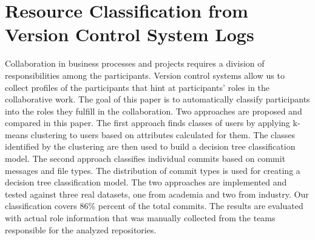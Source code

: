 \chapter{Resource Classification from Version Control System Logs}
\label{chap:resource-classfication}

Collaboration in business processes and projects requires a division of responsibilities among the participants. Version control systems allow us to collect profiles of the participants that hint at participants' roles in the collaborative work. The goal of this paper is to automatically classify participants into the roles they fulfill in the collaboration. Two approaches are proposed and compared in this paper. The first approach finds classes of users by applying k-means clustering to users based on attributes calculated for them. The classes identified by the clustering are then used to build a decision tree classification model. The second approach classifies individual commits based on commit messages and file types. The distribution of commit types is used for creating a decision tree classification model. The two approaches are implemented and tested against three real datasets, one from academia and two from industry. Our classification covers 86\% percent of the total commits. The results are evaluated with actual role information that was manually collected from the teams responsible for the analyzed repositories.






